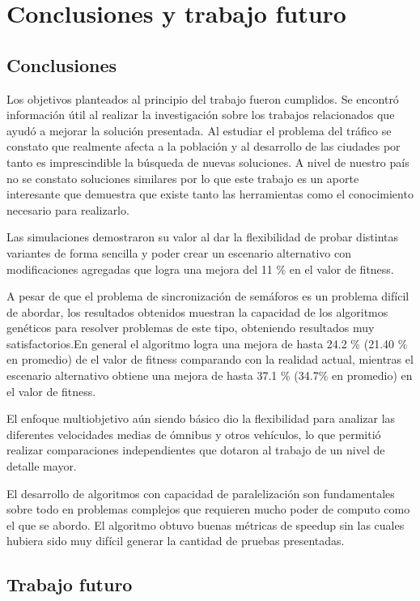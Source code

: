 \chapter{Conclusiones y trabajo futuro}

\section{Conclusiones}
Los objetivos planteados al principio del trabajo fueron cumplidos.
Se encontró información útil al realizar la investigación sobre los trabajos relacionados que ayudó a mejorar la solución presentada. 
Al estudiar el problema del tráfico se constato que realmente afecta a la población y al desarrollo de las ciudades por tanto es imprescindible la búsqueda de nuevas soluciones. A nivel de nuestro país no se constato soluciones similares por lo que este trabajo es un aporte interesante que demuestra que existe tanto las herramientas como el conocimiento necesario para realizarlo.
 
Las simulaciones demostraron su valor al dar la flexibilidad de probar distintas variantes de forma sencilla y poder crear un escenario alternativo con modificaciones agregadas que logra una mejora del 11 \% en el valor de fitness.
 
A pesar de que el problema de sincronización de semáforos es un problema difícil de abordar, los resultados obtenidos muestran la capacidad de los algoritmos genéticos para resolver problemas de este tipo, obteniendo resultados muy  satisfactorios.En general el algoritmo logra una mejora de hasta  24.2 \% (21.40 \% en promedio) de el valor de fitness comparando con la realidad actual, mientras el escenario alternativo obtiene una mejora de hasta 37.1 \% (34.7\% en promedio) en el valor de fitness.

El enfoque multiobjetivo aún siendo básico dio la flexibilidad para analizar las diferentes velocidades medias de ómnibus y otros vehículos, lo que permitió realizar comparaciones independientes que dotaron al trabajo de un nivel de detalle mayor.

El desarrollo de algoritmos con capacidad de paralelización son fundamentales sobre  todo en problemas complejos que requieren mucho poder de computo como el que se abordo. El algoritmo obtuvo buenas métricas de speedup sin las cuales hubiera sido muy difícil generar la cantidad de pruebas presentadas.

\section{Trabajo futuro}


